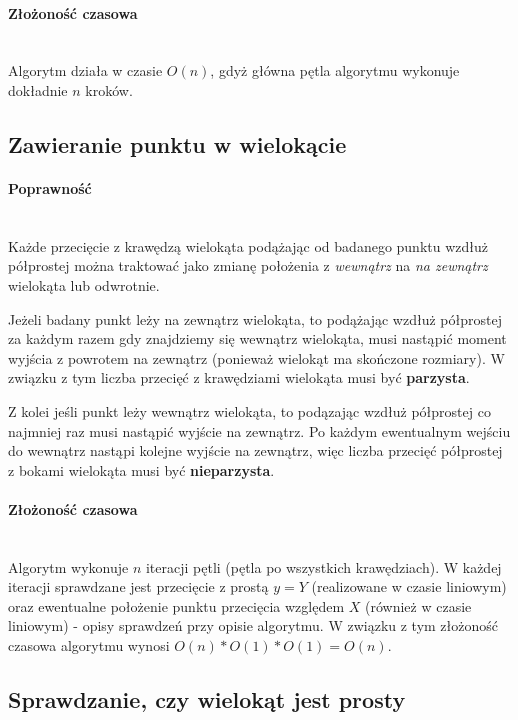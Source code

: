 \documentclass{article}
\begin{document}
\paragraph{Złożoność czasowa} \mbox{}\\
Algorytm działa w czasie \(O(n)\), gdyż główna pętla algorytmu wykonuje dokładnie \(n\) kroków.


\subsection{Zawieranie punktu w wielokącie}

\paragraph{Poprawność} \mbox{}\\
Każde przecięcie z krawędzą wielokąta podążając od badanego punktu wzdłuż półprostej można traktować jako zmianę położenia z \emph{wewnątrz} na \emph{na zewnątrz} wielokąta lub odwrotnie.

Jeżeli badany punkt leży na zewnątrz wielokąta, to podążając wzdłuż półprostej za każdym razem gdy znajdziemy się wewnątrz wielokąta, musi nastąpić moment wyjścia z powrotem na zewnątrz (ponieważ wielokąt ma skończone rozmiary). W związku z tym liczba przecięć z krawędziami wielokąta musi być \textbf{parzysta}.

Z kolei jeśli punkt leży wewnątrz wielokąta, to podązając wzdłuż półprostej co najmniej raz musi nastąpić wyjście na zewnątrz. Po każdym ewentualnym wejściu do wewnątrz nastąpi kolejne wyjście na zewnątrz, więc liczba przecięć półprostej z bokami wielokąta musi być \textbf{nieparzysta}.

\paragraph{Złożoność czasowa} \mbox{}\\
Algorytm wykonuje $n$ iteracji pętli (pętla po wszystkich krawędziach). W każdej iteracji sprawdzane jest przecięcie z prostą $y = Y$ (realizowane w czasie liniowym) oraz ewentualne położenie punktu przecięcia względem $X$ (również w czasie liniowym) - opisy sprawdzeń przy opisie algorytmu. W związku z tym złożoność czasowa algorytmu wynosi $O(n) * O(1) * O(1) = O(n)$.


\subsection{Sprawdzanie, czy wielokąt jest prosty}
\end{document}
